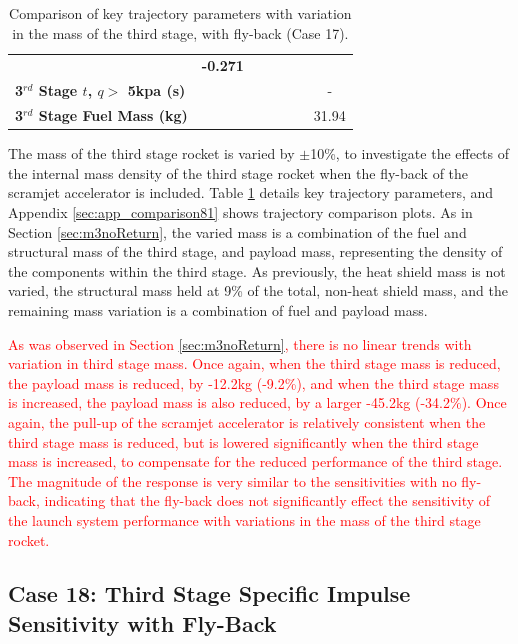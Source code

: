 \begin{table}[ht]
\begin{tabular}{l c c c c c c}
		& \textbf{-0.271}
		\\
		\textbf{3$^{rd}$ Stage $t$, $q >$ 5kpa (s)}
		& \thirdqOverFivemThreeNinety
		& \thirdqOverFivemThreeNinetyFive
		& \thirdqOverFivemThreeStandard
		& \thirdqOverFivemThreeOneHundredFive
		& \thirdqOverFivemThreeOneHundredTen
		& -
		\\
		\textbf{3$^{rd}$ Stage Fuel Mass (kg)}
		& \thirdmFuelmThreeNinety
		& \thirdmFuelmThreeNinetyFive
		& \thirdmFuelmThreeStandard
		& \thirdmFuelmThreeOneHundredFive
		& \thirdmFuelmThreeOneHundredTen
		&31.94
		\\
		\hline 
	\end{tabular} 
	\caption{Comparison of key trajectory parameters with variation in the mass of the third stage, with fly-back (Case 17).}
	\label{tab:comparison81}
\end{table}

The mass of the third stage rocket is varied by $\pm$10\%, to investigate the effects of the internal mass density of the third stage rocket when the fly-back of the scramjet accelerator is included. Table \ref{tab:comparison81} details key trajectory parameters, and Appendix \ref{sec:app_comparison81} shows trajectory comparison plots. As in Section \ref{sec:m3noReturn}, the varied mass is a combination of the fuel and structural mass of the third stage, and payload mass, representing the density of the components within the third stage. As previously, the heat shield mass is not varied, the structural mass held at 9\% of the total, non-heat shield mass, and the remaining mass variation is a combination of fuel and payload mass.

\textcolor{red}{
As was observed in Section \ref{sec:m3noReturn}, there is no linear trends with variation in third stage mass. Once again, when the third stage mass is reduced, the payload mass is reduced, by -12.2kg (-9.2\%), and when the third stage mass is increased, the payload mass is also reduced, by a larger -45.2kg (-34.2\%). Once again, the pull-up of the scramjet accelerator is relatively consistent when the third stage mass is reduced, but is lowered significantly when the third stage mass is increased, to compensate for the reduced performance of the third stage. The magnitude of the response is very similar to the sensitivities with no fly-back, indicating that the fly-back does not significantly effect the sensitivity of the launch system performance with variations in the mass of the third stage rocket. 
}


\subsection{Case 18: Third Stage Specific Impulse Sensitivity with Fly-Back}

